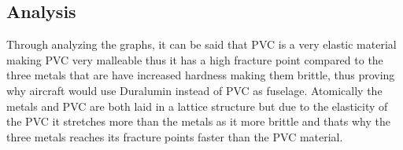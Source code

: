 \documentclass[11pt]{article}
\begin{document}
\begin{multicols}{2}

\section{Analysis}
\label{Analysis Section}

Through analyzing the graphs, it can be said that PVC is a very elastic material making PVC very malleable thus it has a high fracture point compared to the three metals that are have increased hardness making them brittle, thus proving why aircraft would use Duralumin instead of PVC as fuselage. Atomically the metals and PVC are both laid in a lattice structure but due to the elasticity of the PVC it stretches more than the metals as it more brittle and thats why the three metals reaches its fracture points faster than the PVC material. 


\end{multicols}



\end{document}
